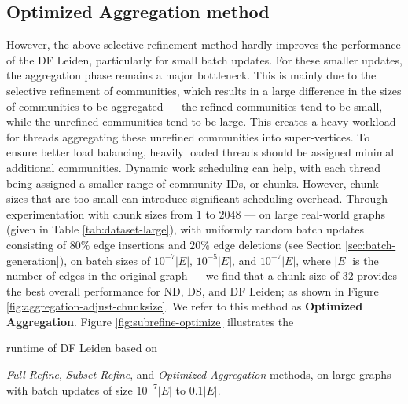 




\subsection{Optimized Aggregation method}
\label{sec:optimized-aggregation-method}

However, the above selective refinement method hardly improves the performance of the DF Leiden, particularly for small batch updates. For these smaller updates, the aggregation phase remains a major bottleneck. This is mainly due to the selective refinement of communities, which results in a large difference in the sizes of communities to be aggregated --- the refined communities tend to be small, while the unrefined communities tend to be large. This creates a heavy workload for threads aggregating these unrefined communities into super-vertices. To ensure better load balancing, heavily loaded threads should be assigned minimal additional communities. Dynamic work scheduling can help, with each thread being assigned a smaller range of community IDs, or chunks. However, chunk sizes that are too small can introduce significant scheduling overhead. Through experimentation with chunk sizes from $1$ to $2048$ --- on large real-world graphs (given in Table \ref{tab:dataset-large}), with uniformly random batch updates consisting of $80\%$ edge insertions and $20\%$ edge deletions (see Section \ref{sec:batch-generation}), on batch sizes of $10^{-7}|E|$, $10^{-5}|E|$, and $10^{-7}|E|$, where $|E|$ is the number of edges in the original graph --- we find that a chunk size of $32$ provides the best overall performance for ND, DS, and DF Leiden; as shown in Figure \ref{fig:aggregation-adjust-chunksize}. We refer to this method as \textbf{Optimized Aggregation}. Figure \ref{fig:subrefine-optimize} illustrates the runtime of DF Leiden based on \textit{Full Refine}, \textit{Subset Refine}, and \textit{Optimized Aggregation} methods, on large graphs with batch updates of size $10^{-7}|E|$ to $0.1|E|$.




